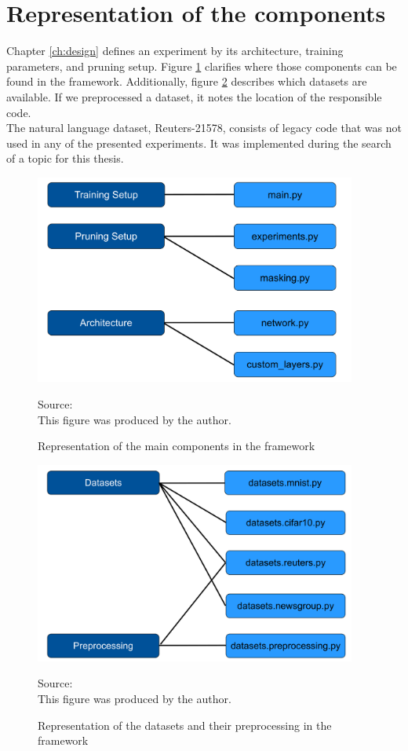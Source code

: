 \section{Representation of the components}
Chapter \ref{ch:design} defines an experiment by its architecture, training parameters, and pruning setup. Figure \ref{fig:Setup Representation} clarifies where those components can be found in the framework. 
Additionally, figure \ref{fig:Dataset Representation} describes which datasets are available. If we preprocessed a dataset, it notes the location of the responsible code.\\
The natural language dataset, Reuters-21578, consists of legacy code that was not used in any of the presented experiments. It was implemented during the search of a topic for this thesis.
\begin{figure}
	\centering
	\includegraphics[width=400px]{gfx/5-Implementation/components.png}
	\caption{Representation of the main components in the framework}
	\label{fig:Setup Representation}
	\vspace{7pt}
	\footnotesize{
		Source:\\
		This figure was produced by the author.
	}
\end{figure}
\begin{figure}
	\centering
	\includegraphics[width=400px]{gfx/5-Implementation/datasets.png}
	\caption{Representation of the datasets and their preprocessing in the framework}
	\label{fig:Dataset Representation}
	\vspace{7pt}
	\footnotesize{
		Source:\\
		This figure was produced by the author.
	}
\end{figure}

